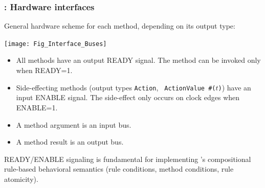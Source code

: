 \begin{frame}
\frametitle{{\BSV}: Hardware interfaces}

\footnotesize

General hardware scheme for each {\BSV} method, depending on its output type:

\begin{center}
\texttt{[image: Fig\_Interface\_Buses]}
\end{center}

\begin{itemize}

 \item All methods have an output READY signal.  The method can be
       invoked only when READY=1.

 \item Side-effecting methods (output types {\tt Action}, {\tt
       ActionValue \#($t$)}) have an input ENABLE signal.  The
       side-effect only occurs on clock edges when ENABLE=1.

 \item A method argument is an input bus.
 \item A method result is an output bus.
\end{itemize}

READY/ENABLE signaling is fundamental for implementing {\BSV}'s
compositional rule-based behavioral semantics (rule conditions, method
conditions, rule atomicity).

\end{frame}


